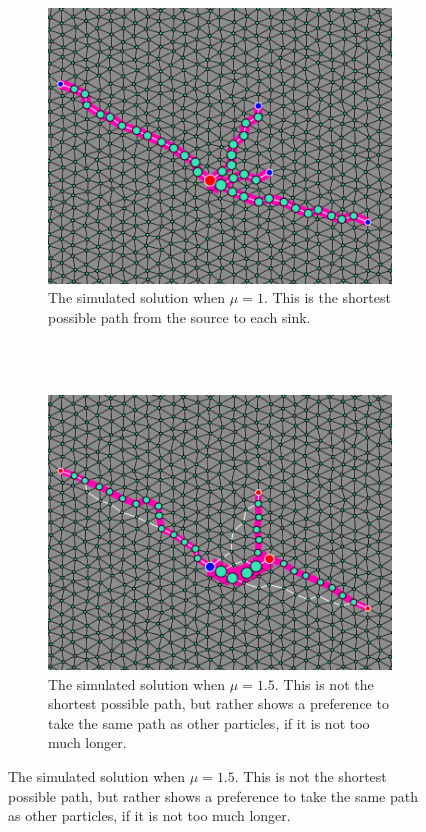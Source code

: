 \begin{figure}
\centering
\begin{subfigure}[b]{0.48\textwidth}
\includegraphics[width=\textwidth]{img/Lin.png}
\caption{The simulated solution when $\mu=1$. This is the shortest possible path from the source to each sink.
\\
\\}
\end{subfigure}
~
\begin{subfigure}[b]{0.48\textwidth}
\includegraphics[width=\textwidth]{img/NonLin.png}
\caption{The simulated solution when $\mu=1.5$. This is not the shortest possible path, but rather shows a preference to take the same path as other particles, if it is not too much longer.}

\end{subfigure}
\end{figure}

